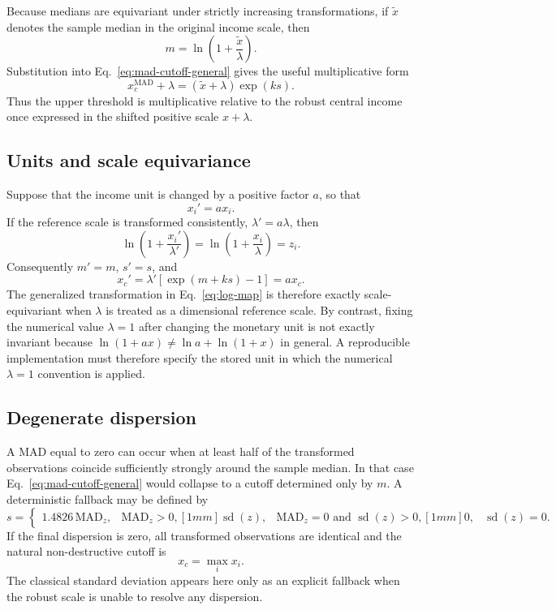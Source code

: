 \documentclass[12pt]{article}
\def\\{ }%
\newcommand{\be}{\begin{equation}}
\newcommand{\ee}{\end{equation}}
\numberwithin{equation}{section}
\begin{document}
Because medians are equivariant under strictly increasing transformations, if $\widetilde{x}$ denotes the sample median in the original income scale, then
\be
m
=
\ln\left(1+\frac{\widetilde{x}}{\lambda}\right).
\label{eq:median-equivariance}
\ee
Substitution into Eq.~\eqref{eq:mad-cutoff-general} gives the useful multiplicative form
\be
x_c^{\mathrm{MAD}}+\lambda
=
(\widetilde{x}+\lambda)\exp(ks).
\label{eq:multiplicative-cutoff}
\ee
Thus the upper threshold is multiplicative relative to the robust central income once expressed in the shifted positive scale $x+\lambda$.

\subsection{Units and scale equivariance}

Suppose that the income unit is changed by a positive factor $a$, so that
\be
x_i'=a x_i.
\label{eq:unit-rescale}
\ee
If the reference scale is transformed consistently, $\lambda'=a\lambda$, then
\be
\ln\left(1+\frac{x_i'}{\lambda'}\right)
=
\ln\left(1+\frac{x_i}{\lambda}\right)
=z_i.
\label{eq:transform-unit-invariance}
\ee
Consequently $m'=m$, $s'=s$, and
\be
x_c'
=
\lambda'\left[\exp(m+ks)-1\right]
=
a x_c.
\label{eq:cutoff-equivariance}
\ee
The generalized transformation in Eq.~\eqref{eq:log-map} is therefore exactly scale-equivariant when $\lambda$ is treated as a dimensional reference scale. By contrast, fixing the numerical value $\lambda=1$ after changing the monetary unit is not exactly invariant because $\ln(1+ax)\neq \ln a+\ln(1+x)$ in general. A reproducible implementation must therefore specify the stored unit in which the numerical $\lambda=1$ convention is applied.

\subsection{Degenerate dispersion}

A MAD equal to zero can occur when at least half of the transformed observations coincide sufficiently strongly around the sample median. In that case Eq.~\eqref{eq:mad-cutoff-general} would collapse to a cutoff determined only by $m$. A deterministic fallback may be defined by
\be
s
=
\begin{cases}
1.4826\,\mathrm{MAD}_{z}, & \mathrm{MAD}_{z}>0,\\[1mm]
\operatorname{sd}(z), & \mathrm{MAD}_{z}=0\text{ and }\operatorname{sd}(z)>0,\\[1mm]
0, & \operatorname{sd}(z)=0.
\end{cases}
\label{eq:fallback-scale}
\ee
If the final dispersion is zero, all transformed observations are identical and the natural non-destructive cutoff is
\be
x_c
=
\max_i x_i.
\label{eq:zero-dispersion-cutoff}
\ee
The classical standard deviation appears here only as an explicit fallback when the robust scale is unable to resolve any dispersion.
\end{document}
